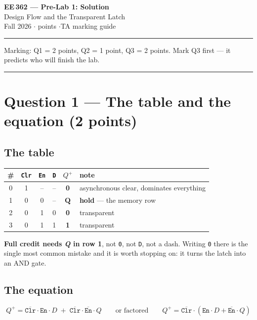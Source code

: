 \documentclass[11pt]{article}
\newcommand{\code}[1]{\texttt{#1}}
\newcommand{\hr}{\vspace{2pt}\hrule\vspace{6pt}}
\begin{document}
\begin{center}
{\Large\bfseries EE\,362 --- Pre-Lab 1: Solution}\\[2pt]
{\large Design Flow and the Transparent Latch}\\[4pt]
Fall 2026 \quad$\cdot$ points \quad$\cdot$\quad TA marking guide
\end{center}
\hr

{\small Marking: Q1 = 2 points, Q2 = 1 point, Q3 = 2 points. Mark Q3 first --- it
predicts who will finish the lab.}

\vspace{4pt}\hr

\section*{Question 1 --- The table and the equation (2 points)}

\subsection*{The table}

\begin{center}
\begin{tabular}{c|ccc|c|l}
\toprule
\# & \code{Clr} & \code{En} & \code{D} & $Q^{+}$ & note \\
\midrule
0 & 1 & -- & -- & \textbf{0} & asynchronous clear, dominates everything \\
1 & 0 & 0 & -- & $\mathbf{Q}$ & \textbf{hold} --- the memory row \\
2 & 0 & 1 & 0 & \textbf{0} & transparent \\
3 & 0 & 1 & 1 & \textbf{1} & transparent \\
\bottomrule
\end{tabular}
\end{center}

\textbf{Full credit needs \emph{Q} in row 1}, not \code{0}, not \code{D}, not a
dash. Writing \code{0} there is the single most common mistake and it is worth
stopping on: it turns the latch into an AND gate.

\subsection*{The equation}

\[
Q^{+} = \overline{\code{Clr}}\cdot\code{En}\cdot D \;+\; \overline{\code{Clr}}\cdot\overline{\code{En}}\cdot Q
\qquad\text{or factored}\qquad
Q^{+} = \overline{\code{Clr}}\cdot\left( \code{En}\cdot D + \overline{\code{En}}\cdot Q \right)
\]
\end{document}
